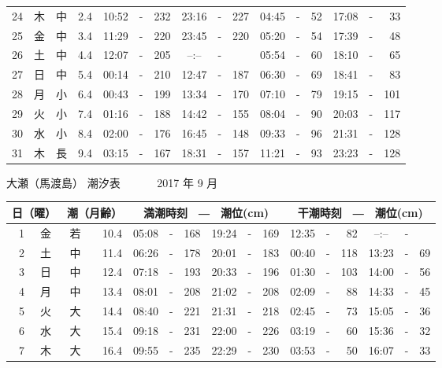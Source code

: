 \documentclass[12pt.a4j]{jsarticle}
\begin{document}
\begin{center}
\begin{table}[ht]
\begin{tabular}{|rc|cr|ccrccr|ccrccr|}
24 & 木 & 中 &  2.4 &  10:52 &-& 232  &  23:16 &-& 227  &   04:45 &-&  52  &   17:08 &-&  33  \\
25 & 金 & 中 &  3.4 &  11:29 &-& 220  &  23:45 &-& 220  &   05:20 &-&  54  &   17:39 &-&  48  \\
26 & 土 & 中 &  4.4 &  12:07 &-& 205  &  --:-- &-&     &   05:54 &-&  60  &   18:10 &-&  65  \\
27 & 日 & 中 &  5.4 &  00:14 &-& 210  &  12:47 &-& 187  &   06:30 &-&  69  &   18:41 &-&  83  \\
28 & 月 & 小 &  6.4 &  00:43 &-& 199  &  13:34 &-& 170  &   07:10 &-&  79  &   19:15 &-& 101  \\
29 & 火 & 小 &  7.4 &  01:16 &-& 188  &  14:42 &-& 155  &   08:04 &-&  90  &   20:03 &-& 117  \\
30 & 水 & 小 &  8.4 &  02:00 &-& 176  &  16:45 &-& 148  &   09:33 &-&  96  &   21:31 &-& 128  \\
31 & 木 & 長 &  9.4 &  03:15 &-& 167  &  18:31 &-& 157  &   11:21 &-&  93  &   23:23 &-& 128  \\
   \hline
   \end{tabular}
\end{table}
\newpage
 {\LARGE 大瀬（馬渡島）  潮汐表　　　}
 {\large 2017 年  9 月}\\
 \begin{table}[ht]
    \begin{tabular}{|rc|cr|ccrccr|ccrccr|}
    \hline
    \multicolumn{2}{|c|}{日（曜）} & \multicolumn{2}{c|}{潮（月齢）} & \multicolumn{6}{c|}{満潮時刻　―　潮位(cm)} & \multicolumn{6}{c|}{干潮時刻　―　潮位(cm)} \\
 \hline
 1 & 金 & 若 & 10.4 &  05:08 &-& 168  &  19:24 &-& 169  &   12:35 &-&  82  &   --:-- &-&     \\
 2 & 土 & 中 & 11.4 &  06:26 &-& 178  &  20:01 &-& 183  &   00:40 &-& 118  &   13:23 &-&  69  \\
 3 & 日 & 中 & 12.4 &  07:18 &-& 193  &  20:33 &-& 196  &   01:30 &-& 103  &   14:00 &-&  56  \\
 4 & 月 & 中 & 13.4 &  08:01 &-& 208  &  21:02 &-& 208  &   02:09 &-&  88  &   14:33 &-&  45  \\
 5 & 火 & 大 & 14.4 &  08:40 &-& 221  &  21:31 &-& 218  &   02:45 &-&  73  &   15:05 &-&  36  \\
 6 & 水 & 大 & 15.4 &  09:18 &-& 231  &  22:00 &-& 226  &   03:19 &-&  60  &   15:36 &-&  32  \\
 7 & 木 & 大 & 16.4 &  09:55 &-& 235  &  22:29 &-& 230  &   03:53 &-&  50  &   16:07 &-&  33  \\

\end{tabular}
\end{table}
\end{center}
\end{document}
